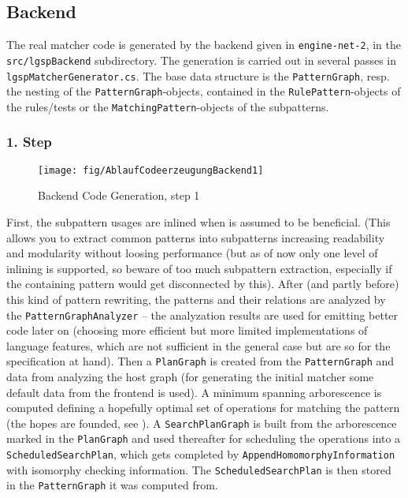 \subsection{Backend}

The real matcher code is generated by the backend given in \texttt{engine-net-2}, in the \texttt{src/lgsp\-Backend} subdirectory.
The generation is carried out in several passes in \texttt{lgsp\-Matcher\-Generator.cs}.
The base data structure is the \texttt{PatternGraph}, resp. the nesting of the \texttt{PatternGraph}-objects, contained in the \texttt{RulePattern}-objects of the rules/tests or the \texttt{Matching\-Pattern}-objects of the subpatterns.

\pagebreak

\subsubsection*{1. Step}

\begin{figure}[htbp]
  \centering
  \texttt{[image: fig/AblaufCodeerzeugungBackend1]}
  \caption{Backend Code Generation, step 1}
  \label{figbackendcodegen1}
\end{figure}

First, the subpattern usages are inlined when  is assumed to be beneficial.
(This allows you to extract common patterns into subpatterns increasing readability and modularity without loosing performance (but as of now only one level of inlining is supported, so beware of too much subpattern extraction, especially if the containing pattern would get disconnected by this). 
After (and partly before) this kind of pattern rewriting, the patterns and their relations are analyzed by the \texttt{PatternGraphAnalyzer} -- the analyzation results are used for emitting better code later on (choosing more efficient but more limited implementations of language features, which are not sufficient in the general case but are so for the specification at hand).
Then a \texttt{PlanGraph} is created from the \texttt{PatternGraph} and data from analyzing the host graph (for generating the initial matcher some default data from the frontend is used).
A minimum spanning arborescence is computed defining a hopefully optimal set of operations for matching the pattern (the hopes are founded, see \cite{BKG:07}).
A \texttt{SearchPlanGraph} is built from the arborescence marked in the \texttt{PlanGraph} and used thereafter for scheduling the operations into a \texttt{ScheduledSearchPlan}, which gets completed by \texttt{Append\-Homomorphy\-Information} with isomorphy checking information.
The \texttt{ScheduledSearchPlan} is then stored in the \texttt{PatternGraph} it was computed from.


